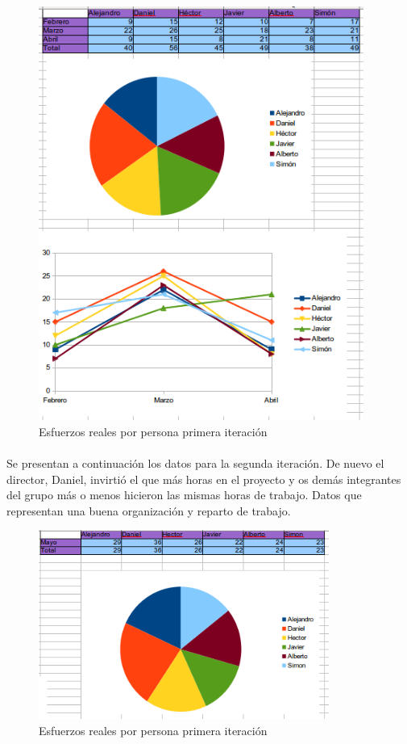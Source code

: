 \begin{figure}[h!]
\centering
\includegraphics[width=0.95\textwidth]{img/6171}
\caption{Esfuerzos reales por persona primera iteración}
 \label{fig:6171}
\end{figure} 

\paragraph{} Se presentan a continuación los datos para la segunda iteración. De nuevo el director, Daniel, invirtió el que más horas en el proyecto y os demás integrantes del grupo más o menos hicieron las mismas horas de trabajo. Datos que representan una buena organización y reparto de trabajo.

\begin{figure}[h!]
\centering
\includegraphics[width=0.85\textwidth]{img/6172}
\caption{Esfuerzos reales por persona primera iteración}
 \label{fig:6172}
\end{figure} 